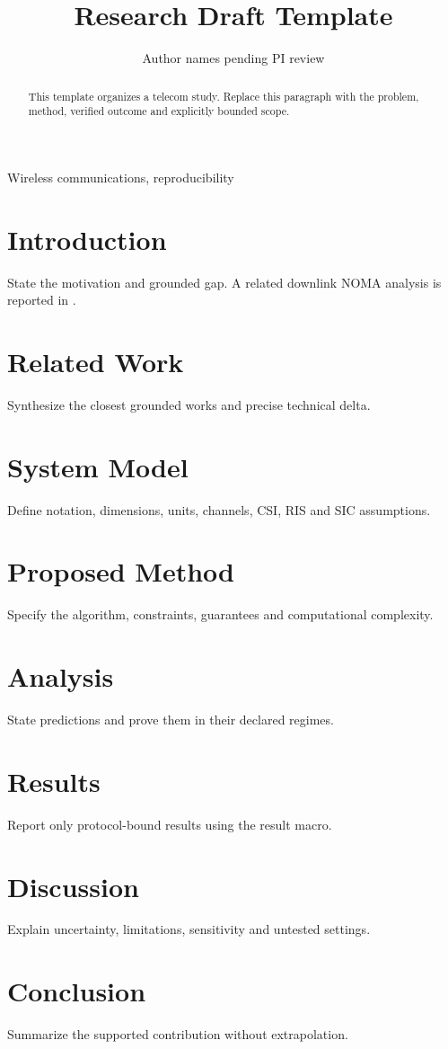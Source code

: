 \documentclass[journal]{IEEEtran}
\title{Research Draft Template}
\author{Author names pending PI review}
\begin{document}
\maketitle
\begin{abstract}
This template organizes a telecom study. Replace this paragraph with the
problem, method, verified outcome and explicitly bounded scope.
\end{abstract}
\begin{IEEEkeywords}Wireless communications, reproducibility\end{IEEEkeywords}
\section{Introduction}
State the motivation and grounded gap. A related downlink NOMA analysis is
reported in \cite{Ding2014}.
\section{Related Work}
Synthesize the closest grounded works and precise technical delta.
\section{System Model}
Define notation, dimensions, units, channels, CSI, RIS and SIC assumptions.
\section{Proposed Method}
Specify the algorithm, constraints, guarantees and computational complexity.
\section{Analysis}
State predictions and prove them in their declared regimes.
\section{Results}
Report only protocol-bound results using the result macro.
\section{Discussion}
Explain uncertainty, limitations, sensitivity and untested settings.
\section{Conclusion}
Summarize the supported contribution without extrapolation.


\end{document}
